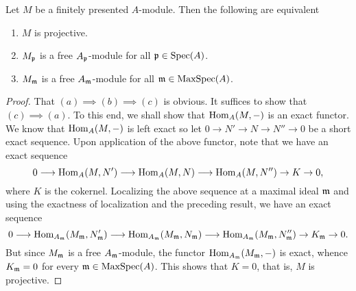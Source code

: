 \begin{theorem}
    Let $M$ be a finitely presented $A$-module. Then the following are equivalent
    \begin{enumerate}[label=(\alph*)]
        \item $M$ is projective. 
        \item $M_{\mathfrak{p}}$ is a free $A_{\mathfrak{p}}$-module for all $\mathfrak{p}\in\operatorname{Spec}(A)$.
        \item $M_{\mathfrak{m}}$ is a free $A_{\mathfrak{m}}$-module for all $\mathfrak{m}\in\operatorname{MaxSpec}(A)$.
    \end{enumerate}
\end{theorem}
\begin{proof}
    That $(a)\implies(b)\implies(c)$ is obvious. It suffices to show that $(c)\implies(a)$. To this end, we shall show that $\operatorname{Hom}_A(M,-)$ is an exact functor. We know that $\operatorname{Hom}_A(M,-)$ is left exact so let $0\to N'\to N\to N''\to 0$ be a short exact sequence. Upon application of the above functor, note that we have an exact sequence 
    \begin{equation*}
        0\longrightarrow\operatorname{Hom}_A(M, N')\longrightarrow\operatorname{Hom}_A(M, N)\longrightarrow\operatorname{Hom}_A(M, N'')\to K\to 0,
    \end{equation*}
    where $K$ is the cokernel. Localizing the above sequence at a maximal ideal $\mathfrak{m}$ and using the exactness of localization and the preceding result, we have an exact sequence 
    \begin{equation*}
        0\longrightarrow\operatorname{Hom}_{A_{\mathfrak{m}}}(M_{\mathfrak{m}}, N'_{\mathfrak{m}})\longrightarrow\operatorname{Hom}_{A_{\mathfrak{m}}}(M_{\mathfrak{m}}, N_{\mathfrak{m}})\longrightarrow\operatorname{Hom}_{A_{\mathfrak{m}}}(M_{\mathfrak{m}}, N''_{\mathfrak{m}})\to K_{\mathfrak{m}}\to 0.
    \end{equation*}
    But since $M_{\mathfrak{m}}$ is a free $A_{\mathfrak{m}}$-module, the functor $\operatorname{Hom}_{A_{\mathfrak{m}}}(M_{\mathfrak{m}},-)$ is exact, whence $K_{\mathfrak{m}} = 0$ for every $\mathfrak{m}\in\operatorname{MaxSpec}(A)$. This shows that $K = 0$, that is, $M$ is projective.
\end{proof}


